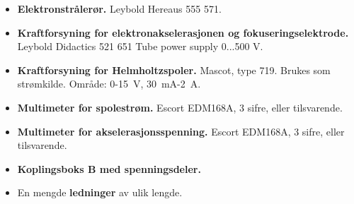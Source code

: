 \documentclass[../Elmag-labhefte-2020.tex]{subfiles}
\begin{document}
\vspace{-4mm} 
\begin{itemize}
    \item \textbf{Elektronstrålerør.} Leybold Hereaus 555 571.
    \item \textbf{Kraftforsyning for elektronakselerasjonen og fokuseringselektrode.} Leybold Didactics 521 651	Tube power supply 0...500 V.
    
    \item \textbf{Kraftforsyning for Helmholtzspoler.} Mascot, type 719.  Brukes som strømkilde. 
    Område: 0-\SI{15}{\volt}, \SI{30}{\milli\ampere}-\SI{2}{\ampere}.
    \item \textbf{Multimeter for spolestrøm.} Escort EDM168A, 3 sifre, eller tilsvarende.
    \item \textbf{Multimeter for akselerasjonsspenning.} Escort EDM168A, 3 sifre, eller tilsvarende.
   
    \item \textbf{Koplingsboks B med spenningsdeler.}
    \item En mengde \textbf{ledninger} av ulik lengde.
\end{itemize}
\end{document}
